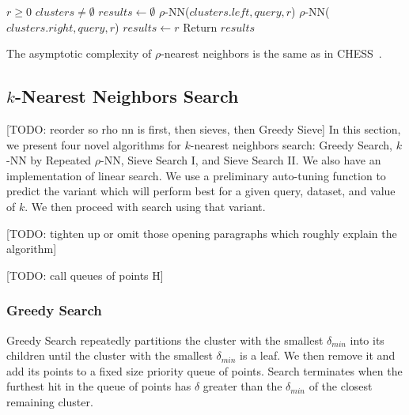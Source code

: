 \begin{algorithm} 
    \caption{$\rho$-NN(\emph{clusters, query, r})} 
    \label{alg:rnn} 
    \begin{algorithmic}[2]
        \REQUIRE $r \geq 0$
        \REQUIRE $clusters \neq \emptyset$
        \STATE $results \leftarrow \emptyset$
                \STATE $\rho$-NN($clusters.left, query, r$)
            \ENDIF
        \ENDIF
                \STATE $\rho$-NN($clusters.right, query, r$)
            \ENDIF
        \ENDIF
                    \STATE $results \leftarrow r$
                \ENDIF
            \ENDFOR
        \ENDIF
        \STATE Return $results$
    \end{algorithmic}
    \end{algorithm}

The asymptotic complexity of $\rho$-nearest neighbors is the same as in CHESS~\cite{ishaq2019clustered}.

\subsection{\texorpdfstring{$k$}{k}-Nearest Neighbors Search}
\label{subsec:methods:knn-search}

[TODO: reorder so rho nn is first, then sieves, then Greedy Sieve]
In this section, we present four novel algorithms for $k$-nearest neighbors search: Greedy Search, $k$-NN by Repeated $\rho$-NN, Sieve Search I, and Sieve Search II. 
We also have an implementation of linear search. We use a preliminary auto-tuning function to predict the variant which will perform 
best for a given query, dataset, and value of $k$. We then proceed with search using that variant.  


[TODO: tighten up or omit those opening paragraphs which roughly explain the algorithm]


[TODO: call queues of points H]
\subsubsection{Greedy Search}
\label{subsubsec:methods:knn-search:greedy-search}
Greedy Search repeatedly partitions the cluster with the smallest $\delta_{min}$ into its children 
until the cluster with the smallest $\delta_{min}$ is a leaf. We then remove it and add its points to a fixed size priority queue of points. 
Search terminates when the furthest hit in the queue of points has $\delta$ greater than the $\delta_{min}$ of the closest remaining cluster.

